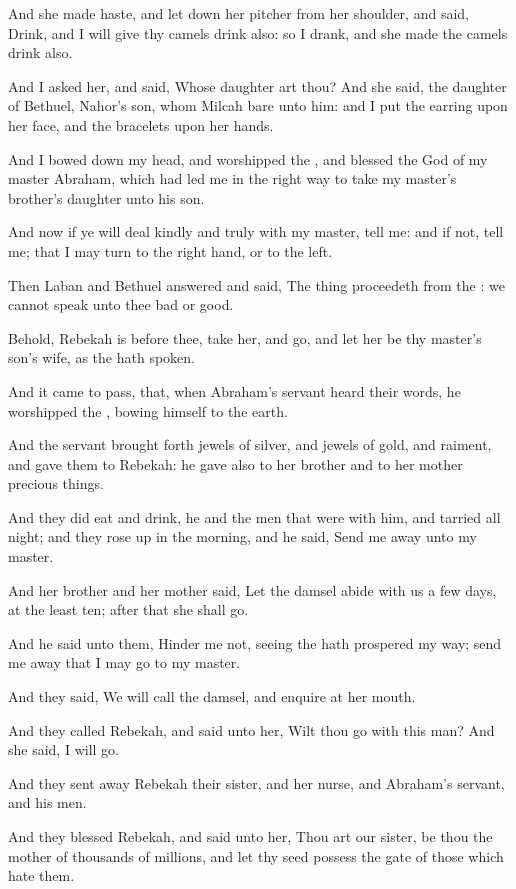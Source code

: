 \verse And she made haste, and let down her pitcher from her shoulder, and said, Drink, and I will give thy camels drink also: so I drank, and she made the camels drink also.

\verse And I asked her, and said, Whose daughter art thou? And she said, the daughter of Bethuel, Nahor's son, whom Milcah bare unto him: and I put the earring upon her face, and the bracelets upon her hands.

\verse And I bowed down my head, and worshipped the \LORD, and blessed the \LORD God of my master Abraham, which had led me in the right way to take my master's brother's daughter unto his son.

\verse And now if ye will deal kindly and truly with my master, tell me: and if not, tell me; that I may turn to the right hand, or to the left.

\verse Then Laban and Bethuel answered and said, The thing proceedeth from the \LORD: we cannot speak unto thee bad or good.

\verse Behold, Rebekah is before thee, take her, and go, and let her be thy master's son's wife, as the \LORD hath spoken.

\verse And it came to pass, that, when Abraham's servant heard their words, he worshipped the \LORD, bowing himself to the earth.

\verse And the servant brought forth jewels of silver, and jewels of gold, and raiment, and gave them to Rebekah: he gave also to her brother and to her mother precious things.

\verse And they did eat and drink, he and the men that were with him, and tarried all night; and they rose up in the morning, and he said, Send me away unto my master.

\verse And her brother and her mother said, Let the damsel abide with us a few days, at the least ten; after that she shall go.

\verse And he said unto them, Hinder me not, seeing the \LORD hath prospered my way; send me away that I may go to my master.

\verse And they said, We will call the damsel, and enquire at her mouth.

\verse And they called Rebekah, and said unto her, Wilt thou go with this man? And she said, I will go.

\verse And they sent away Rebekah their sister, and her nurse, and Abraham's servant, and his men.

\verse And they blessed Rebekah, and said unto her, Thou art our sister, be thou the mother of thousands of millions, and let thy seed possess the gate of those which hate them.

